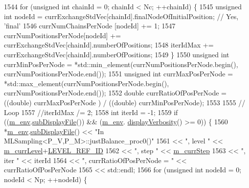 \begin{DoxyCode}
1544   \textcolor{keywordflow}{for} (\textcolor{keywordtype}{unsigned} \textcolor{keywordtype}{int} chainId = 0; chainId < Nc; ++chainId) \{
1545     \textcolor{keywordtype}{unsigned} \textcolor{keywordtype}{int} nodeId = currExchangeStdVec[chainId].finalNodeOfInitialPosition; \textcolor{comment}{// Yes, 'final'}
1546     currNumChainsPerNode   [nodeId] += 1;
1547     currNumPositionsPerNode[nodeId] += currExchangeStdVec[chainId].numberOfPositions;
1548     iterIdMax                       += currExchangeStdVec[chainId].numberOfPositions;
1549   \}
1550   \textcolor{keywordtype}{unsigned} \textcolor{keywordtype}{int} currMinPosPerNode = *std::min\_element(currNumPositionsPerNode.begin(), 
      currNumPositionsPerNode.end());
1551   \textcolor{keywordtype}{unsigned} \textcolor{keywordtype}{int} currMaxPosPerNode = *std::max\_element(currNumPositionsPerNode.begin(), 
      currNumPositionsPerNode.end());
1552   \textcolor{keywordtype}{double} currRatioOfPosPerNode = ((double) currMaxPosPerNode ) / ((double) currMinPosPerNode);
1553 
1555   \textcolor{comment}{// Loop}
1557 \textcolor{comment}{}  \textcolor{comment}{//iterIdMax /= 2;}
1558   \textcolor{keywordtype}{int} iterId = -1;
1559   \textcolor{keywordflow}{if} ((\hyperlink{class_q_u_e_s_o_1_1_m_l_sampling_a13f1ca4fe9f94822fe572a743eaced1d}{m\_env}.\hyperlink{class_q_u_e_s_o_1_1_base_environment_a8a0064746ae8dddfece4229b9ad374d6}{subDisplayFile}()) && (\hyperlink{class_q_u_e_s_o_1_1_m_l_sampling_a13f1ca4fe9f94822fe572a743eaced1d}{m\_env}.
      \hyperlink{class_q_u_e_s_o_1_1_base_environment_a1fe5f244fc0316a0ab3e37463f108b96}{displayVerbosity}() >= 0)) \{
1560     *\hyperlink{class_q_u_e_s_o_1_1_m_l_sampling_a13f1ca4fe9f94822fe572a743eaced1d}{m\_env}.\hyperlink{class_q_u_e_s_o_1_1_base_environment_a8a0064746ae8dddfece4229b9ad374d6}{subDisplayFile}() << \textcolor{stringliteral}{"In MLSampling<P\_V,P\_M>::justBalance\_proc0()"}
1561                             << \textcolor{stringliteral}{", level "} << \hyperlink{class_q_u_e_s_o_1_1_m_l_sampling_af9416874c856e50f3b35270e801f17e4}{m\_currLevel}+\hyperlink{_m_l_sampling_level_options_8h_a68d15eaf394d210effcf584b938206d3}{LEVEL\_REF\_ID}
1562                             << \textcolor{stringliteral}{", step "}  << \hyperlink{class_q_u_e_s_o_1_1_m_l_sampling_a1b1f8ccb4823bdfa26ec652f0807c63e}{m\_currStep}
1563                             << \textcolor{stringliteral}{", iter "}  << iterId
1564                             << \textcolor{stringliteral}{", currRatioOfPosPerNode = "} << currRatioOfPosPerNode
1565                             << std::endl;
1566     \textcolor{keywordflow}{for} (\textcolor{keywordtype}{unsigned} \textcolor{keywordtype}{int} nodeId = 0; nodeId < Np; ++nodeId) \{

\end{DoxyCode}
